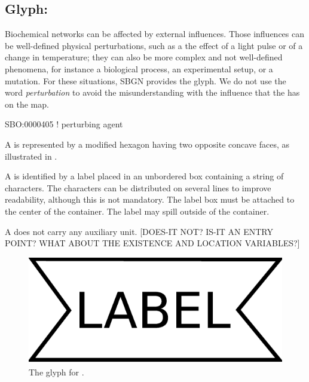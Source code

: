 \color{red}

\subsection{Glyph: }
\label{sec:perturbation}
 
Biochemical networks can be affected by external influences. Those
influences can be well-defined physical perturbations, such as a the effect of a light
pulse or of a change in temperature; they can also be more complex and not
well-defined phenomena, for instance a biological process, an experimental
setup, or a mutation.  For these situations, SBGN provides the
 glyph. We do not use the word \emph{perturbation} to avoid the misunderstanding with the influence that the  has on the map. 

\begin{glyphDescription}

\glyphSboTerm SBO:0000405 ! perturbing agent

\glyphContainer A  is represented by a modified hexagon
having two opposite concave faces, as illustrated in .

\glyphLabel A  is identified by a label placed in an
unbordered box containing a string of characters.  The characters can be
distributed on several lines to improve readability, although this is not
mandatory.  The label box must be attached to the center of the
 container.  The label may spill outside of the container.

\glyphAux A  does not carry any auxiliary unit. [DOES-IT NOT? IS-IT AN ENTRY POINT? WHAT ABOUT THE EXISTENCE AND LOCATION VARIABLES?]

\end{glyphDescription}

\begin{figure}[H]
  \centering
  \includegraphics[scale = 0.3]{images/perturbation}
  \caption{The \ER glyph for .}
  \label{fig:perturbation}
\end{figure}

\normalcolor
